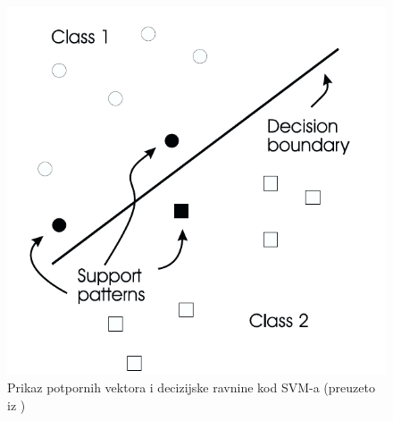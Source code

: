 \documentclass[times, utf8, diplomski]{fer}
\theoremstyle{definition}
\begin{document}
\begin{figure}[h]
\centering
\includegraphics[scale=0.5]{omc_hyperplane.png}
\caption{Prikaz potpornih vektora i decizijske ravnine kod SVM-a  (preuzeto iz \cite{Lecun95learningalgorithms})}
\end{figure}
\end{document}
